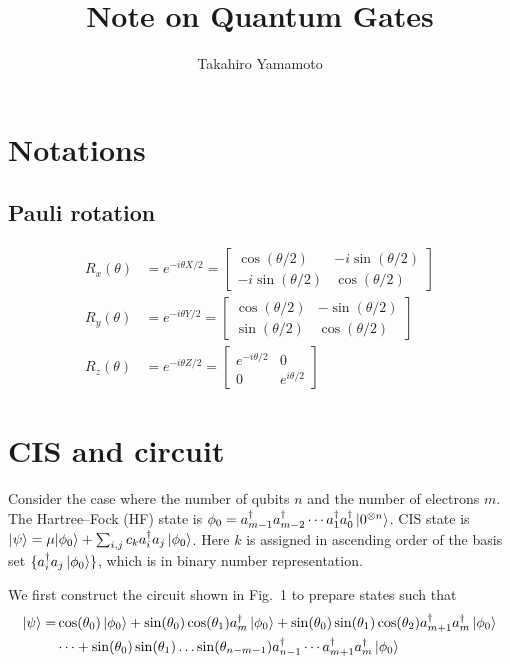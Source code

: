 \documentclass[11pt, oneside]{article}   	%
\title{Note on Quantum Gates}
\author{Takahiro Yamamoto}
\begin{document}
\maketitle
\section{Notations}
\subsection{Pauli rotation}
\begin{align}
R_x(\theta) &= e^{-i \theta X/2} = 
\begin{bmatrix}
\cos(\theta/2) & -i \sin(\theta/2) \\
-i \sin(\theta/2) & \cos(\theta/2)
\end{bmatrix} \\
R_y(\theta) &= e^{-i \theta Y/2} = 
\begin{bmatrix}
\cos(\theta/2) & -\sin(\theta/2) \\
\sin(\theta/2) & \cos(\theta/2)
\end{bmatrix} \\
R_z(\theta) &= e^{-i \theta Z/2} = 
\begin{bmatrix}
e^{-i \theta/2} & 0 \\
0 & e^{i \theta/2}
\end{bmatrix}
\end{align}

\section{CIS and circuit}
Consider the case where the number of qubits $n$ and the number of electrons $m$.
The Hartree–Fock (HF) state is $\phi_0 = a^{\dagger}_{m-1} a^{\dagger}_{m-2} \cdots a^{\dagger}_{1} a^{\dagger}_{0} \ket{0^{\otimes n}}$.
CIS state is $\ket{\psi} = \mu {\ket{\phi_0}} + \sum_{i, j} c_k a^{\dagger}_i a_j \ket{\phi_0}$.
Here $k$ is assigned in ascending order of the basis set $\{ a^{\dagger}_i a_j \ket{\phi_0} \}$, which is in binary number representation.

We first construct the circuit shown in Fig.~1 to prepare states such that 
\begin{align}
\ket{\psi} 
=&\cos(\theta_0) \ket{\phi_0} + \sin(\theta_0) \cos(\theta_1) a^{\dagger}_m \ket{\phi_0} + \sin(\theta_0) \sin(\theta_1) \cos(\theta_2) a^{\dagger}_{m+1} a^{\dagger}_m \ket{\phi_0}  \\
& \cdots + \sin(\theta_0) \sin(\theta_1) \dots \sin(\theta_{n-m-1}) a^{\dagger}_{n-1} \cdots a^{\dagger}_{m+1} a^{\dagger}_m \ket{\phi_0} 
\end{align}
\end{document}
